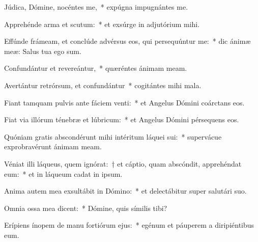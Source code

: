 \item Júdica, Dómine, nocéntes me,~* expúgna impugnántes me.

\item Apprehénde arma et scutum:~* et exsúrge in adjutórium mihi.

\item Effúnde frámeam, et conclúde advérsus eos, qui persequúntur me:~* dic ánimæ meæ: Salus tua ego sum.

\item Confundántur et revereántur,~* quæréntes ánimam meam.

\item Avertántur retrórsum, et confundántur~* cogitántes mihi mala.

\item Fiant tamquam pulvis ante fáciem venti:~* et Angelus Dómini coárctans eos.

\item Fiat via illórum ténebræ et lúbricum:~* et Angelus Dómini pérsequens eos.

\item Quóniam gratis abscondérunt mihi intéritum láquei sui:~* supervácue exprobravérunt ánimam meam.

\item Véniat illi láqueus, quem ignórat:~† et cáptio, quam abscóndit, apprehéndat eum:~* et in láqueum cadat in ipsum.

\item Anima autem mea exsultábit in Dómino:~* et delectábitur super salutári suo.

\item Omnia ossa mea dicent:~* Dómine, quis símilis tibi?

\item Erípiens ínopem de manu fortiórum ejus:~* egénum et páuperem a diripiéntibus eum.
